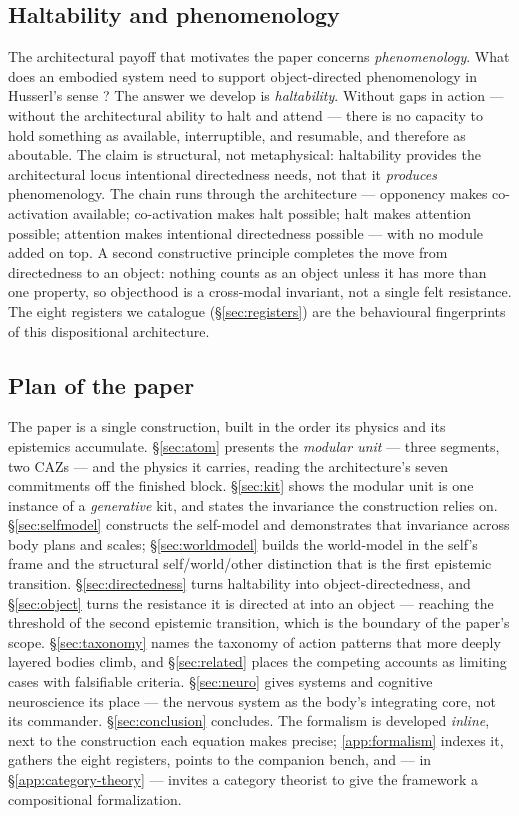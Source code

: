\documentclass{article}
\begin{document}
\subsection*{Haltability and phenomenology}

The architectural payoff that motivates the paper concerns
\emph{phenomenology}.  What does an embodied system need to support
object-directed phenomenology in Husserl's sense
\citep{Husserl1900_LU,Husserl1913_Ideas}?  The answer we develop is
\emph{haltability}.  Without gaps in action --- without the architectural
ability to halt and attend --- there is no capacity to hold something as
available, interruptible, and resumable, and therefore as aboutable.  The
claim is structural, not metaphysical: haltability provides the
architectural locus intentional directedness needs, not that it
\emph{produces} phenomenology.  The chain runs through the architecture
--- opponency makes co-activation available; co-activation makes halt
possible; halt makes attention possible; attention makes intentional
directedness possible --- with no module added on top.  A second
constructive principle completes the move from directedness to an object:
nothing counts as an object unless it has more than one property, so
objecthood is a cross-modal invariant, not a single felt resistance.  The
eight registers we catalogue (\S\ref{sec:registers}) are the behavioural
fingerprints of this dispositional architecture.

\subsection*{Plan of the paper}

The paper is a single construction, built in the order its physics and
its epistemics accumulate.  \S\ref{sec:atom} presents the \emph{modular unit} ---
three segments, two CAZs --- and the physics it carries, reading the
architecture's seven commitments off the finished block.
\S\ref{sec:kit} shows the modular unit is one instance of a \emph{generative}
kit, and states the invariance the construction relies on.
\S\ref{sec:selfmodel} constructs the self-model and demonstrates that
invariance across body plans and scales; \S\ref{sec:worldmodel} builds
the world-model in the self's frame and the structural self/world/other
distinction that is the first epistemic transition.
\S\ref{sec:directedness} turns haltability into object-directedness, and
\S\ref{sec:object} turns the resistance it is directed at into an object
--- reaching the threshold of the second epistemic transition, which is
the boundary of the paper's scope.  \S\ref{sec:taxonomy} names the taxonomy of action patterns that
more deeply layered bodies climb, and \S\ref{sec:related} places the
competing accounts as limiting cases with falsifiable criteria.
\S\ref{sec:neuro} gives systems and cognitive neuroscience its place ---
the nervous system as the body's integrating core, not its commander.
\S\ref{sec:conclusion} concludes.  The formalism is developed
\emph{inline}, next to the construction each equation makes precise;
\ref{app:formalism} indexes it, gathers the eight registers, points
to the companion bench, and --- in \S\ref{app:category-theory} --- invites a
category theorist to give the framework a compositional formalization.
\end{document}
